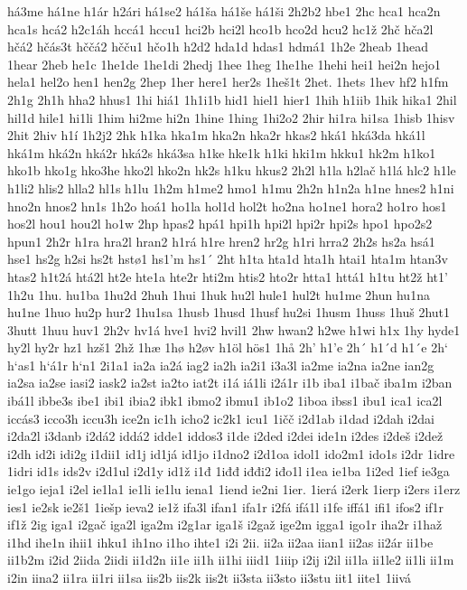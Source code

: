 há3me
há1ne
h1ár
h2ári
há1se2
há1ša
há1še
há1ši
2h2b2
hbe1
2hc
hca1
hca2n
hca1s
hcá2
h2c1áh
hccá1
hccu1
hci2b
hci2l
hco1b
hco2d
hcu2
hc1ž
2hč
hča2l
hčá2
hčás3t
hččá2
hčču1
hčo1h
h2d2
hda1d
hdas1
hdmá1
1h2e
2heab
1head
1hear
2heb
he1c
1he1de
1he1di
2hedj
1hee
1heg
1he1he
1hehi
hei1
hei2n
hejo1
hela1
hel2o
hen1
hen2g
2hep
1her
here1
her2s
1heš1t
2het.
1hets
1hev
hf2
h1fm
2h1g
2h1h
hha2
hhus1
1hi
hiá1
1h1i1b
hid1
hiel1
hier1
1hih
h1iib
1hik
hika1
2hil
hil1d
hile1
hi1li
1him
hi2me
hi2n
1hine
1hing
1hi2o2
2hir
hi1ra
hi1sa
1hisb
1hisv
2hit
2hiv
h1í
1h2j2
2hk
h1ka
hka1m
hka2n
hka2r
hkas2
hká1
hká3da
hká1l
hká1m
hká2n
hká2r
hká2s
hká3sa
h1ke
hke1k
h1ki
hki1m
hkku1
hk2m
h1ko1
hko1b
hko1g
hko3he
hko2l
hko2n
hk2s
h1ku
hkus2
2h2l
h1la
h2lač
h1lá
hlc2
h1le
h1li2
hlis2
hlla2
hl1s
h1lu
1h2m
h1me2
hmo1
h1mu
2h2n
h1n2a
h1ne
hnes2
h1ni
hno2n
hnos2
hn1s
1h2o
hoá1
ho1la
hol1d
hol2t
ho2na
ho1ne1
hora2
ho1ro
hos1
hos2l
hou1
hou2l
ho1w
2hp
hpas2
hpá1
hpi1h
hpi2l
hpi2r
hpi2s
hpo1
hpo2s2
hpun1
2h2r
h1ra
hra2l
hran2
h1rá
h1re
hren2
hr2g
h1ri
hrra2
2h2s
hs2a
hsá1
hse1
hs2g
h2si
hs2t
hstø1
hs1'm
hs1´
2ht
h1ta
hta1d
hta1h
htai1
hta1m
htan3v
htas2
h1t2á
htá2l
ht2e
hte1a
hte2r
hti2m
htis2
hto2r
htta1
httá1
h1tu
ht2ž
ht1'
1h2u
1hu.
hu1ba
1hu2d
2huh
1hui
1huk
hu2l
hule1
hul2t
hu1me
2hun
hu1na
hu1ne
1huo
hu2p
hur2
1hu1sa
1husb
1husd
1husf
hu2si
1husm
1huss
1huš
2hut1
3hutt
1huu
huv1
2h2v
hv1á
hve1
hvi2
hvil1
2hw
hwan2
h2we
h1wi
h1x
1hy
hyde1
hy2l
hy2r
hz1
hzš1
2hž
1hæ
1hø
h2øv
h1öl
hös1
1hå
2h'
h1'e
2h´
h1´d
h1´e
2h`
h`as1
h`á1r
h`n1
2i1a1
ia2a
ia2á
iag2
ia2h
ia2i1
i3a3l
ia2me
ia2na
ia2ne
ian2g
ia2sa
ia2se
iasi2
iask2
ia2st
ia2to
iat2t
i1á
iá1li
i2á1r
i1b
iba1
i1bač
iba1m
i2ban
ibá1l
ibbe3s
ibe1
ibi1
ibia2
ibk1
ibmo2
ibmu1
ib1o2
1iboa
ibss1
ibu1
ica1
ica2l
iccás3
icco3h
iccu3h
ice2n
ic1h
icho2
ic2k1
icu1
1ičč
i2d1ab
i1dad
i2dah
i2dai
i2da2l
i3danb
i2dá2
iddá2
idde1
iddos3
i1de
i2ded
i2dei
ide1n
i2des
i2deš
i2dež
i2dh
id2i
idi2g
i1dii1
id1j
id1já
id1jo
i1dno2
i2d1oa
idol1
ido2m1
ido1s
i2dr
1idre
1idri
id1s
ids2v
i2d1ul
i2d1y
id1ž
i1đ
1iđđ
iđđi2
iđo1l
i1ea
ie1ba
1i2ed
1ief
ie3ga
ie1go
ieja1
i2el
ie1la1
ie1li
ie1lu
iena1
1iend
ie2ni
1ier.
1ierá
i2erk
1ierp
i2ers
i1erz
ies1
ie2sk
ie2š1
1iešp
ieva2
ie1ž
ifa3l
ifan1
ifa1r
i2fá
ifá1l
i1fe
iffá1
ifi1
ifos2
if1r
if1ž
2ig
iga1
i2gač
iga2l
iga2m
i2g1ar
iga1š
i2gaž
ige2m
igga1
igo1r
iha2r
i1haž
i1hd
ihe1n
ihii1
ihku1
ih1no
i1ho
ihte1
i2i
2ii.
ii2a
ii2aa
iian1
ii2as
ii2ár
ii1be
ii1b2m
i2id
2iida
2iidi
ii1d2n
ii1e
ii1h
ii1hi
iiid1
1iiip
i2ij
i2il
ii1la
ii1le2
ii1li
ii1m
i2in
iina2
ii1ra
ii1ri
ii1sa
iis2b
iis2k
iis2t
ii3sta
ii3sto
ii3stu
iit1
iite1
1iivá
